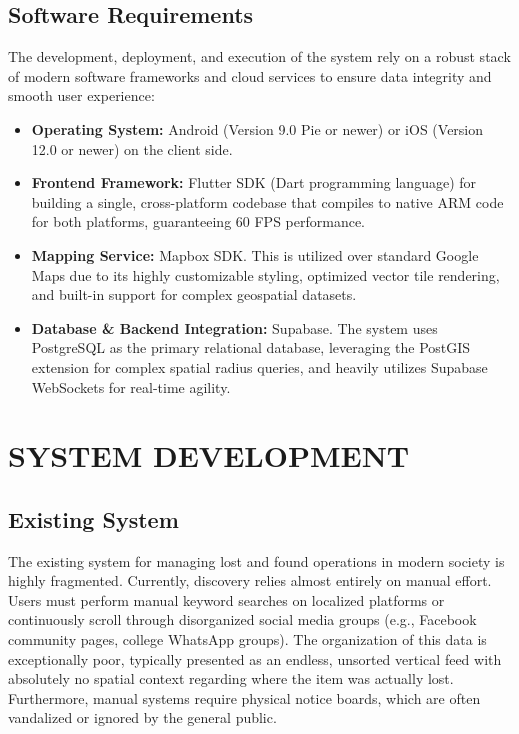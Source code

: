 \documentclass[12pt,a4paper]{report}
\begin{document}
\section{Software Requirements}
The development, deployment, and execution of the system rely on a robust stack of modern software frameworks and cloud services to ensure data integrity and smooth user experience:
\begin{itemize}
\item \textbf{Operating System:} Android (Version 9.0 Pie or newer) or iOS (Version 12.0 or newer) on the client side.
\item \textbf{Frontend Framework:} Flutter SDK (Dart programming language) for building a single, cross-platform codebase that compiles to native ARM code for both platforms, guaranteeing 60 FPS performance.
\item \textbf{Mapping Service:} Mapbox SDK. This is utilized over standard Google Maps due to its highly customizable styling, optimized vector tile rendering, and built-in support for complex geospatial datasets.
\item \textbf{Database \& Backend Integration:} Supabase. The system uses PostgreSQL as the primary relational database, leveraging the PostGIS extension for complex spatial radius queries, and heavily utilizes Supabase WebSockets for real-time agility.
\end{itemize}

\chapter{SYSTEM DEVELOPMENT}

\section{Existing System}
The existing system for managing lost and found operations in modern society is highly fragmented. Currently, discovery relies almost entirely on manual effort. Users must perform manual keyword searches on localized platforms or continuously scroll through disorganized social media groups (e.g., Facebook community pages, college WhatsApp groups). The organization of this data is exceptionally poor, typically presented as an endless, unsorted vertical feed with absolutely no spatial context regarding where the item was actually lost. Furthermore, manual systems require physical notice boards, which are often vandalized or ignored by the general public.
\end{document}
